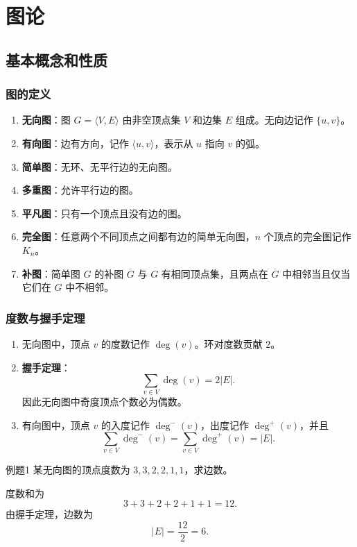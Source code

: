 \section{图论}

\subsection{基本概念和性质}

\subsubsection{图的定义}

\begin{enumerate}
	\item \textbf{无向图}：图 \(G=\langle V,E\rangle\) 由非空顶点集 \(V\) 和边集 \(E\) 组成。无向边记作 \(\{u,v\}\)。
	\item \textbf{有向图}：边有方向，记作 \(\langle u,v\rangle\)，表示从 \(u\) 指向 \(v\) 的弧。
	\item \textbf{简单图}：无环、无平行边的无向图。
	\item \textbf{多重图}：允许平行边的图。
	\item \textbf{平凡图}：只有一个顶点且没有边的图。
	\item \textbf{完全图}：任意两个不同顶点之间都有边的简单无向图，\(n\) 个顶点的完全图记作 \(K_n\)。
	\item \textbf{补图}：简单图 \(G\) 的补图 \(\overline{G}\) 与 \(G\) 有相同顶点集，且两点在 \(\overline{G}\) 中相邻当且仅当它们在 \(G\) 中不相邻。
\end{enumerate}

\subsubsection{度数与握手定理}

\begin{enumerate}
	\item 无向图中，顶点 \(v\) 的度数记作 \(\deg(v)\)。环对度数贡献 \(2\)。
	\item \textbf{握手定理}：
	\[
	\sum_{v\in V}\deg(v)=2|E|.
	\]
	因此无向图中奇度顶点个数必为偶数。
	\item 有向图中，顶点 \(v\) 的入度记作 \(\deg^-(v)\)，出度记作 \(\deg^+(v)\)，并且
	\[
	\sum_{v\in V}\deg^-(v)=\sum_{v\in V}\deg^+(v)=|E|.
	\]
\end{enumerate}

\begin{question}{例题1}
	某无向图的顶点度数为 \(3,3,2,2,1,1\)，求边数。
	
	\begin{solution}
	度数和为
	\[
	3+3+2+2+1+1=12.
	\]
	由握手定理，边数为
	\[
	|E|=\frac{12}{2}=6.
	\]
	\end{solution}
\end{question}

